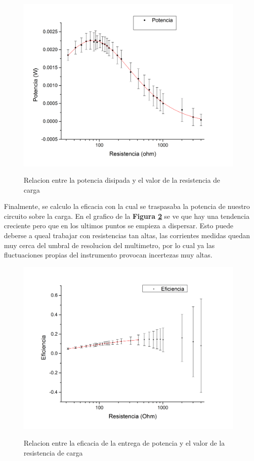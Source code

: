 \documentclass[11pt,a4paper]{article}
\begin{document}
\begin{figure}[h]
  \centering
  \includegraphics[scale=0.45]{Potencia_vs_Resistencia_2}
  \\[1.0cm]
  \label{fig:Pot_Res}
  \caption{Relacion entre la potencia disipada y el valor de la resistencia de carga}
\end{figure}

Finalmente, se calculo la eficacia con la cual se traspasaba la potencia de nuestro circuito sobre la carga. En el grafico de la \textbf{Figura \ref{fig:Efi_Res}} se ve que hay una tendencia creciente pero que en los ultimos puntos se empieza a dispersar. Esto puede deberse a queal trabajar con resistencias tan altas, las corrientes medidas quedan muy cerca del umbral de resolucion del multimetro, por lo cual ya las fluctuaciones propias del instrumento provocan incertezas muy altas. 

\begin{figure}[h]
  \centering
  \includegraphics[scale=0.45]{Eficiencia_vs_Resistencia}
  \\[1.0cm]
  \label{fig:Efi_Res}
  \caption{Relacion entre la eficacia de la entrega de potencia y el valor de la resistencia de carga}
\end{figure}
\end{document}
